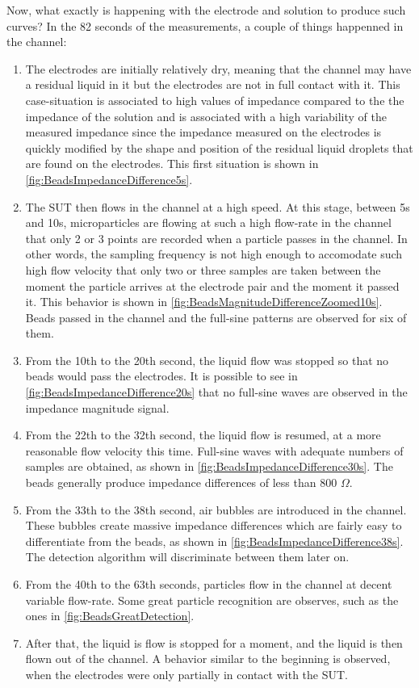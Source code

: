 Now, what exactly is happening with the electrode and solution to produce such curves? In the 82 seconds of the measurements, a couple of things happenned in the channel:
\begin{enumerate}
  \item The electrodes are initially relatively dry, meaning that the channel may have a residual liquid in it but the electrodes are not in full contact with it. This case-situation is associated to high values of impedance compared to the the impedance of the solution and is associated with a high variability of the measured impedance since the impedance measured on the electrodes is quickly modified by the shape and position of the residual liquid droplets that are found on the electrodes. This first situation is shown in \autoref{fig:BeadsImpedanceDifference5s}.
  \item The SUT then flows in the channel at a high speed. At this stage, between 5s and 10s, microparticles are flowing at such a high flow-rate in the channel that only 2 or 3 points are recorded when a particle passes in the channel. In other words, the sampling frequency is not high enough to accomodate such high flow velocity that only two or three samples are taken between the moment the particle arrives at the electrode pair and the moment it passed it. This behavior is shown in \autoref{fig:BeadsMagnitudeDifferenceZoomed10s}. Beads passed in the channel and the full-sine patterns are observed for six of them. 
  \item From the 10th to the 20th second, the liquid flow was stopped so that no beads would pass the electrodes. It is possible to see in \autoref{fig:BeadsImpedanceDifference20s} that no full-sine waves are observed in the impedance magnitude signal. 
  \item From the 22th to the 32th second, the liquid flow is resumed, at a more reasonable flow velocity this time. Full-sine waves with adequate numbers of samples are obtained, as shown in \autoref{fig:BeadsImpedanceDifference30s}. The beads generally produce impedance differences of less than 800 $\Omega$.
  \item From the 33th to the 38th second, air bubbles are introduced in the channel. These bubbles create massive impedance differences which are fairly easy to differentiate from the beads, as shown in \autoref{fig:BeadsImpedanceDifference38s}. The detection algorithm will discriminate between them later on. 
  \item From the 40th to the 63th seconds, particles flow in the channel at decent variable flow-rate. Some great particle recognition are observes, such as the ones in \autoref{fig:BeadsGreatDetection}. 
  \item After that, the liquid is flow is stopped for a moment, and the liquid is then flown out of the channel. A behavior similar to the beginning is observed, when the electrodes were only partially in contact with the SUT. 
\end{enumerate}

